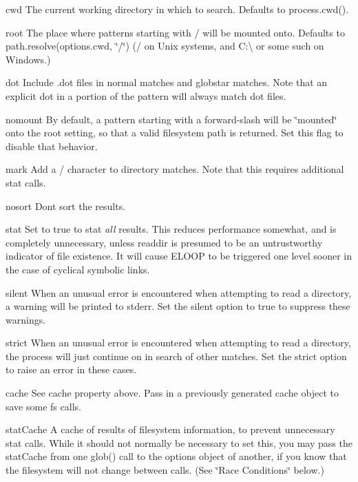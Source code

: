 \begin{DoxyItemize}
\item {\ttfamily cwd} The current working directory in which to search. Defaults to {\ttfamily process.\+cwd()}.
\item {\ttfamily root} The place where patterns starting with {\ttfamily /} will be mounted onto. Defaults to {\ttfamily path.\+resolve(options.\+cwd, \char`\"{}/\char`\"{})} ({\ttfamily /} on Unix systems, and {\ttfamily C\+:\textbackslash{}} or some such on Windows.)
\item {\ttfamily dot} Include {\ttfamily .dot} files in normal matches and {\ttfamily globstar} matches. Note that an explicit dot in a portion of the pattern will always match dot files.
\item {\ttfamily nomount} By default, a pattern starting with a forward-\/slash will be \char`\"{}mounted\char`\"{} onto the root setting, so that a valid filesystem path is returned. Set this flag to disable that behavior.
\item {\ttfamily mark} Add a {\ttfamily /} character to directory matches. Note that this requires additional stat calls.
\item {\ttfamily nosort} Don\textquotesingle{}t sort the results.
\item {\ttfamily stat} Set to true to stat {\itshape all} results. This reduces performance somewhat, and is completely unnecessary, unless {\ttfamily readdir} is presumed to be an untrustworthy indicator of file existence. It will cause E\+L\+O\+O\+P to be triggered one level sooner in the case of cyclical symbolic links.
\item {\ttfamily silent} When an unusual error is encountered when attempting to read a directory, a warning will be printed to stderr. Set the {\ttfamily silent} option to true to suppress these warnings.
\item {\ttfamily strict} When an unusual error is encountered when attempting to read a directory, the process will just continue on in search of other matches. Set the {\ttfamily strict} option to raise an error in these cases.
\item {\ttfamily cache} See {\ttfamily cache} property above. Pass in a previously generated cache object to save some fs calls.
\item {\ttfamily stat\+Cache} A cache of results of filesystem information, to prevent unnecessary stat calls. While it should not normally be necessary to set this, you may pass the stat\+Cache from one glob() call to the options object of another, if you know that the filesystem will not change between calls. (See \char`\"{}\+Race Conditions\char`\"{} below.)

\end{DoxyItemize}
